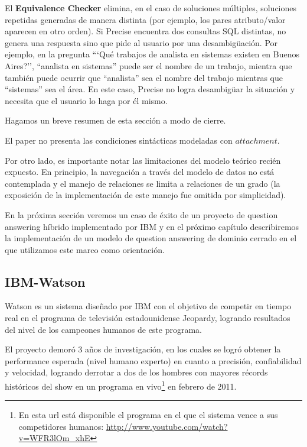 El \textbf{Equivalence Checker} elimina, en el caso de soluciones múltiples, soluciones repetidas generadas de manera distinta (por ejemplo, los pares atributo/valor aparecen en otro orden). Si Precise encuentra dos consultas SQL distintas, no genera una respuesta sino que pide al usuario por una desambigüación. Por ejemplo, en la pregunta ```Qué trabajos de analista en sistemas existen en Buenos Aires?'', ``analista en sistemas'' puede ser el nombre de un trabajo, mientra que también puede ocurrir que ``analista'' sea el nombre del trabajo mientras que ``sistemas'' sea el área. En este caso, Precise no logra desambigüar la situación y necesita que el usuario lo haga por él mismo.

\bigskip

Hagamos un breve resumen de esta sección a modo de cierre.

El paper no presenta las condiciones sintácticas modeladas con $attachment$.


Por otro lado, es importante notar las limitaciones del modelo teórico recién expuesto. En principio, la navegación a través del modelo de datos no está contemplada y el manejo de relaciones se limita a relaciones de un grado (la exposición de la implementación de este manejo fue omitida por simplicidad).

En la próxima sección veremos un caso de éxito de un proyecto de question answering híbrido implementado por IBM y en el próximo capítulo describiremos la implementación de un modelo de question answering de dominio cerrado en el que utilizamos este marco como orientación.


\subsection{IBM-Watson}
\label{subsec:ibm-watson}
Watson\cite{WATSON1}\cite{WATSON2} es un sistema diseñado por IBM con el objetivo de competir en
tiempo real en el programa de televisión estadounidense Jeopardy,
logrando resultados del nivel de los campeones humanos de este
programa.

El proyecto demoró 3 años de investigación, en los cuales se
logró obtener la performance esperada (nivel humano experto) en
cuanto a precisión, confiabilidad y velocidad, logrando derrotar a
dos de los hombres con mayores récords históricos del show en un
programa en vivo\footnote{En esta url está disponible el programa en el que el sistema vence a sus competidores humanos: \url{http://www.youtube.com/watch?v=WFR3lOm_xhE}} en febrero de 2011.

